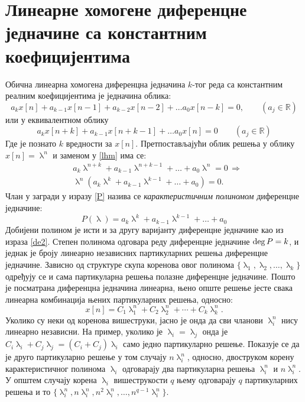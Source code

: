 \section*{Линеарне хомогене диференцне једначине са
константним коефицијентима}

Обична линеарна хомогена диференцна једначина $k$-тог 
реда са константним реалним коефицијентима је једначина облика: 
\begin{equation}
 a_k x[n] + a_{k-1} x[n-1] + a_{k-2} x[n-2] + 
 \ldots a_0 x[n-k] = 0, \qquad (a_j \in \mathbb R)
 \label{de2}
\end{equation}
или у еквивалентном облику 
\begin{equation}
 a_k x[n+k] + a_{k-1} x[n+k-1] + \ldots a_0 x[n] = 0
 \qquad (a_j \in \mathbb R)
 \label{lhm}
\end{equation}
Где је  познато $k$ вредности за $x[n]$. 
Претпостављајући облик решења у облику
$x[n] = \uplambda^n$ и заменом у 
\eqref{lhm} има се: 
\begin{eqnarray}
& a_k \uplambda^{n+k} + 
a_{k-1} \uplambda^{n+k-1} + 
\ldots
+ a_0 \uplambda^n = 0 \, \Rightarrow \\ 
&
\uplambda^n(
a_k \uplambda^{k} + 
a_{k-1} \uplambda^{k-1} + 
\ldots
+ a_0) = 0. \label{P}
\end{eqnarray}
Члан у загради у изразу \eqref{P} назива се 
\textit{карактеристичним полиномом} диференцне једначине:
\begin{equation}
P(\uplambda) =
a_k \uplambda^{k} + 
a_{k-1} \uplambda^{k-1} + 
\ldots
+ a_0
\end{equation}
Добијени полином је исти и за другу варијанту 
диференцне једначине као из израза \eqref{de2}.
Степен полинома одговара реду диференцне једначине 
${\rm deg}\,P = k$, и једнак је броју линеарно независних
партикуларних решења диференцне једначине. 
Зависно од структуре скупа коренова овог полинома
$\{\uplambda_1, \uplambda_2, \ldots, \uplambda_k\}$ 
одређују се и сама партикуларна решења полазне 
диференцне једначине. Пошто је посматрана диференцна
једначина линеарна, њено опште решење јесте 
свака линеарна комбинација њених партикуларних
решења, односно:
\begin{equation}
x[n] = C_1 \uplambda_1^n + C_2 \uplambda_2^n + \cdots
+ C_k \uplambda_k^n.
\end{equation}
Уколико су неки од коренова вишеструки, јасно је онда
да сви чланови $\uplambda_i^n$ нису линеарно независни. На пример, 
уколико је $\uplambda_i = \uplambda_j$ онда је  
$C_i \uplambda_i + C_j \uplambda_j = (C_i + C_j) 
\uplambda_i$ само једно партикуларно решење. Показује
се да је друго партикуларно решење у том случају 
$n\uplambda_i^n$, односно, двоструком корену 
карактеристичног полинома $\uplambda_i$ одговарају
два партикуларна решења $\uplambda_i^n$ и 
$n\uplambda_i^n$. У општем случају корена $\uplambda_i$ вишеструкости $q$ њему одговарају $q$ партикуларних
решења и то $\{\uplambda_i^n, n\uplambda_i^n, 
n^2\uplambda_i^n, \ldots, n^{q-1}\uplambda_i^n\}$. 

